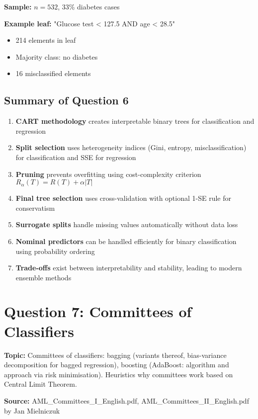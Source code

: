 \documentclass[12pt,a4paper]{article}
\begin{document}
\textbf{Sample:} $n = 532$, 33\% diabetes cases

\textbf{Example leaf:} "Glucose test < 127.5 AND age < 28.5"
\begin{itemize}
    \item 214 elements in leaf
    \item Majority class: no diabetes
    \item 16 misclassified elements
\end{itemize}

\subsection{Summary of Question 6}

\begin{enumerate}
    \item \textbf{CART methodology} creates interpretable binary trees for classification and regression
    \item \textbf{Split selection} uses heterogeneity indices (Gini, entropy, misclassification) for classification and SSE for regression
    \item \textbf{Pruning} prevents overfitting using cost-complexity criterion $R_\alpha(T) = R(T) + \alpha|T|$
    \item \textbf{Final tree selection} uses cross-validation with optional 1-SE rule for conservatism
    \item \textbf{Surrogate splits} handle missing values automatically without data loss
    \item \textbf{Nominal predictors} can be handled efficiently for binary classification using probability ordering
    \item \textbf{Trade-offs} exist between interpretability and stability, leading to modern ensemble methods
\end{enumerate}

\newpage

\section{Question 7: Committees of Classifiers}

\textbf{Topic:} Committees of classifiers: bagging (variants thereof, bias-variance decomposition for bagged regression), boosting (AdaBoost: algorithm and approach via risk minimisation). Heuristics why committees work based on Central Limit Theorem.

\textbf{Source:} AML\_Committees\_I\_English.pdf, AML\_Committees\_II\_English.pdf by Jan Mielniczuk
\end{document}
